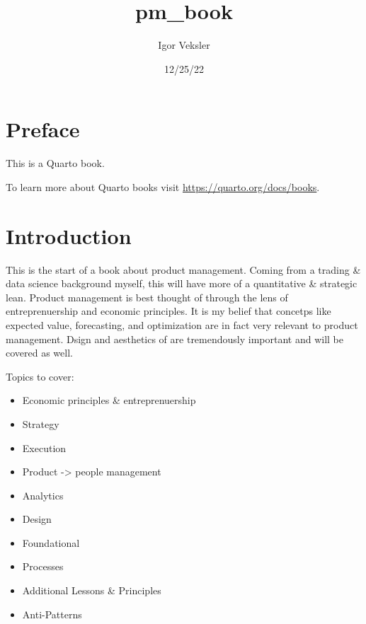 \documentclass[
  letterpaper,
  DIV=11,
  numbers=noendperiod]{scrreprt}
\title{pm\_book}
\author{Igor Veksler}
\date{12/25/22}
\providecommand{\tightlist}{%
  \setlength{\itemsep}{0pt}\setlength{\parskip}{0pt}}\usepackage{longtable,booktabs,array}
\renewcommand*\contentsname{Table of contents}
\newcommand\contentsname{Table of contents}
\begin{document}
\maketitle
\ifdefined\Shaded\renewenvironment{Shaded}{\begin{tcolorbox}[interior hidden, borderline west={3pt}{0pt}{shadecolor}, enhanced, breakable, boxrule=0pt, frame hidden, sharp corners]}{\end{tcolorbox}}\fi

\renewcommand*\contentsname{Table of contents}
{
\hypersetup{linkcolor=}
\setcounter{tocdepth}{2}
\tableofcontents
}

\hypertarget{preface}{%
\chapter*{Preface}\label{preface}}


This is a Quarto book.

To learn more about Quarto books visit
\url{https://quarto.org/docs/books}.


\hypertarget{introduction}{%
\chapter{Introduction}\label{introduction}}

This is the start of a book about product management. Coming from a
trading \& data science background myself, this will have more of a
quantitative \& strategic lean. Product management is best thought of
through the lens of entreprenuership and economic principles. It is my
belief that concetps like expected value, forecasting, and optimization
are in fact very relevant to product management. Dsign and aesthetics of
are tremendously important and will be covered as well.

Topics to cover:

\begin{itemize}
\tightlist
\item
  Economic principles \& entreprenuership
\item
  Strategy
\item
  Execution
\item
  Product -\textgreater{} people management
\item
  Analytics
\item
  Design
\item
  Foundational
\item
  Processes
\item
  Additional Lessons \& Principles
\item
  Anti-Patterns
\end{itemize}
\end{document}
